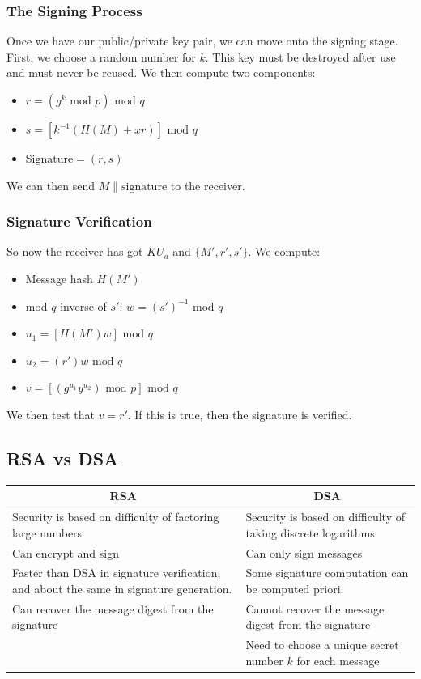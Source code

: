 \documentclass{article}
\newcommand{\Mod}[1]{\text{ mod }#1}
\begin{document}
\subsubsection{The Signing Process}
Once we have our public/private key pair, we can move onto the signing stage. First, we choose a random number for $k$. This key must be destroyed after use and must never be reused. We then compute two components:
\begin{itemize}
  \item $r = (g^{k} \Mod p) \Mod q$
  \item $s = [k^{-1}(H(M) + xr)] \Mod q$
  \item $\text{Signature} = (r, s)$
\end{itemize}
We can then send $M \| \text{signature}$ to the receiver.

\subsubsection{Signature Verification}
So now the receiver has got $KU_{a}$ and $\{M', r', s'\}$. We compute:
\begin{itemize}
  \item Message hash $H(M')$
  \item mod $q$ inverse of $s'$: $w = (s')^{-1} \Mod q$
  \item $u_{1} = [H(M')w] \Mod q$
  \item $u_{2} = (r')w \Mod q$
  \item $v = [(g^{u_{1}}y^{u_{2}}) \Mod p] \Mod q$
\end{itemize}
We then test that $v = r'$. If this is true, then the signature is verified.

\subsection{RSA vs DSA}
\begin{tabular}{|p{6cm}|p{6cm}|}
  \hline
  \multicolumn{1}{|c|}{\textbf{RSA}} & \multicolumn{1}{|c|}{\textbf{\textbf{DSA}}} \\ \hline
  Security is based on difficulty of factoring large numbers & Security is based on difficulty of taking discrete logarithms \\ \hline
  Can encrypt and sign & Can only sign messages \\ \hline
  Faster than DSA in signature verification, and about the same in signature generation. & Some signature computation can be computed priori. \\ \hline
  Can recover the message digest from the signature & Cannot recover the message digest from the signature \\ \hline
  & Need to choose a unique secret number $k$ for each message \\
  \hline
\end{tabular}
\end{document}
